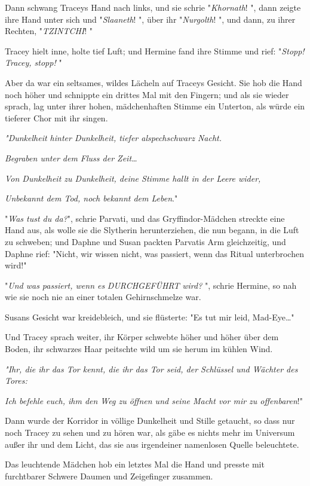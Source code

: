 {Dann schwang Traceys Hand nach links, und sie schrie "\emph{Khornath}! ", dann zeigte ihre Hand unter sich und "\emph{Slaaneth}! ", über ihr "\emph{Nurgolth}! ", und dann, zu ihrer Rechten, "\emph{TZINTCHI}! "

Tracey hielt inne, holte tief Luft; und Hermine fand ihre Stimme und rief: "\emph{Stopp! Tracey, stopp!} "

Aber da war ein seltsames, wildes Lächeln auf Traceys Gesicht. Sie hob die Hand noch höher und schnippte ein drittes Mal mit den Fingern; und als sie wieder sprach, lag unter ihrer hohen, mädchenhaften Stimme ein Unterton, als würde ein tieferer Chor mit ihr singen.

\emph{"\emph{Dunkelheit} \emph{hinter} \emph{Dunkelheit, tiefer alspechschwarz} \emph{Nacht.}}

\emph{Begraben unter dem Fluss der Zeit…}

\emph{Von Dunkelheit zu Dunkelheit, deine Stimme hallt in der Leere wider,}

\emph{Unbekannt dem Tod, noch bekannt dem Leben}."

"\emph{Was tust du da?}", schrie Parvati, und das Gryffindor-Mädchen streckte eine Hand aus, als wolle sie die Slytherin herunterziehen, die nun begann, in die Luft zu schweben; und Daphne und Susan packten Parvatis Arm gleichzeitig, und Daphne rief: "Nicht, wir wissen nicht, was passiert, wenn das Ritual unterbrochen wird!"

"\emph{Und was passiert, wenn es} \emph{DURCHGEFÜHRT} \emph{wird?} ", schrie Hermine, so nah wie sie noch nie an einer totalen Gehirnschmelze war.

Susans Gesicht war kreidebleich, und sie flüsterte: "Es tut mir leid, Mad-Eye…"

Und Tracey sprach weiter, ihr Körper schwebte höher und höher über dem Boden, ihr schwarzes Haar peitschte wild um sie herum im kühlen Wind.

\emph{"\emph{Ihr, die ihr das Tor kennt, die ihr das Tor seid, der Schlüssel und Wächter des Tores:}}

\emph{Ich befehle euch, ihm den Weg zu öffnen und seine Macht vor mir zu offenbaren}!"

Dann wurde der Korridor in völlige Dunkelheit und Stille getaucht, so dass nur noch Tracey zu sehen und zu hören war, als gäbe es nichts mehr im Universum außer ihr und dem Licht, das sie aus irgendeiner namenlosen Quelle beleuchtete.

Das leuchtende Mädchen hob ein letztes Mal die Hand und presste mit furchtbarer Schwere Daumen und Zeigefinger zusammen.

}
